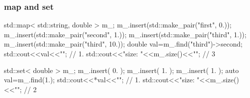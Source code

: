 \documentclass[aspectratio=43]{beamer}
\begin{document}
\begin{frame}[fragile]\frametitle{map and set}
  \begin{Cpplisting}{}
std::map< std::string, double > m_;
m_.insert(std::make_pair("first", 0.));
m_.insert(std::make_pair("second", 1.));
m_.insert(std::make_pair("third", 1.));
m_.insert(std::make_pair("third", 10.));
double val=m_.find("third")->second;
std::cout<<val<<"\n"; // 1.
std::cout<<"size: "<<m_.size()<<"\n"; // 3
  \end{Cpplisting}

  \begin{Cpplisting}{}
std::set< double > m_;
m_.insert( 0. );
m_.insert( 1. );
m_.insert( 1. );
auto val=m_.find(1.);
std::cout<<*val<<"\n"; // 1.
std::cout<<"size: "<<m_.size()<<"\n"; // 2
  \end{Cpplisting}

\end{frame}
\end{document}
